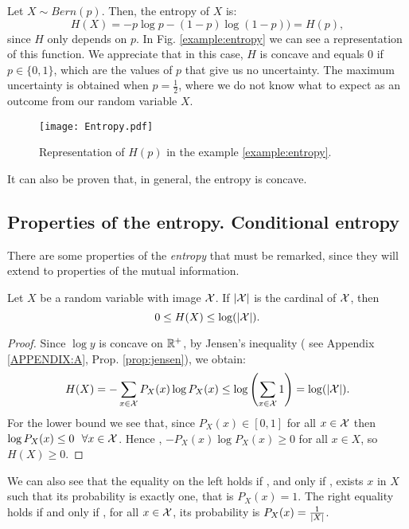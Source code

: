 \begin{nexample}
    \label{example:entropy}
Let $X \sim Bern(p)$. Then, the entropy of $X$ is:
\[
H(X) = -p \log p - (1-p) \log(1-p)) = H(p),
\]
since $H$ only depends on $p$. In Fig. \ref{example:entropy} we can see a representation of this function. We appreciate that in this case, $H$ is concave and equals $0$ if $p \in \{0,1\}$, which are the values of $p$ that give us no uncertainty. The maximum uncertainty is obtained when $p=\frac{1}{2}$, where we do not know what to expect as an outcome from our random variable $X$.

\begin{figure}[H]
    \label{fig:example:entropy}
    \centering
    \texttt{[image: Entropy.pdf]}

      \caption{Representation of $H(p)$ in the example \ref{example:entropy}.}
\end{figure}

\end{nexample}
It can also be proven that, in general, the entropy is concave. 


\subsection{Properties of the entropy. Conditional entropy}

There are some properties of the \emph{entropy} that must be remarked, since they will extend to properties of the mutual information.


\begin{nprop}\label{entr:prop:1}
    Let $X$ be a random variable with image $\mathcal{X}$. If $|\mathcal{X}|$ is the cardinal of $\mathcal{X}$, then
    $$
0 \leq H(X) \leq \log(|\mathcal{X}|).
    $$
\end{nprop}
\begin{proof}
    Since $\log y$ is concave on $\mathbb{R}^+$, by Jensen's inequality ( see Appendix \ref{APPENDIX:A}, Prop. \ref{prop:jensen}), we obtain:
    $$
    H(X) = - \sum_{x \in \mathcal{X}}P_X (x)\log P_X(x) \leq \log\left(\sum_{x \in \mathcal{X}} 1\right) = \log(|\mathcal{X}|).
    $$
    For the lower bound we see that, since $P_X(x) \in [0,1]$ for all  $x \in \mathcal{X} $ then $\log P_X(x) \leq 0 \ \ \forall x \in \mathcal{X}$. Hence , $-P_X(x) \log P_X(x) \geq 0$ for all $x \in X$, so $H(X) \geq 0$.
\end{proof}
We can also see that the equality on the left holds if , and only if , exists $ x $ in  $X$ such that its probability is exactly one, that is $P_X(x) = 1$. The right equality holds if and only if , for all $x \in \mathcal{X}$, its probability is $P_X(x) = \frac{1}{\left\lvert X\right\rvert}$.

